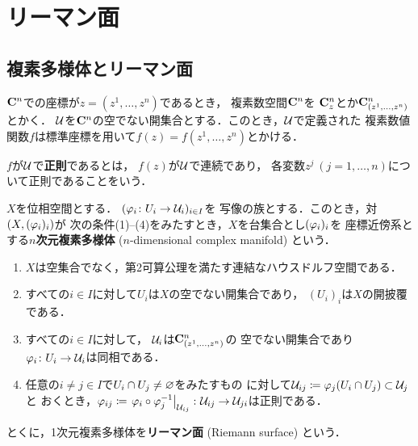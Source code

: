 
\section{リーマン面}

\subsection{複素多様体とリーマン面}

$\mathbf{C}^{n}$での座標が$z=(z^{1},\dots,z^{n})$であるとき，
複素数空間$\mathbf{C}^{n}$を
$\mathbf{C}^{n}_{z}$とか$\mathbf{C}^{n}_{(z^{1},\dots,z^{n})}$とかく．
$\mathcal{U}$を$\mathbf{C}^n$の空でない開集合とする．このとき，$\mathcal{U}$で定義された
複素数値関数$f$は標準座標を用いて$f(z)=f(z^{1},\dots,z^{n})$とかける．

$f$が$\mathcal{U}$で\textbf{正則}であるとは，
$f(z)$が$\mathcal{U}$で連続であり，
各変数$z^{j}\ (j=1,\dots,n)$について正則であることをいう．

\begin{Definition}\label{def:mnf}
    $X$を位相空間とする．
    $(\varphi_{i}\colon U_{i}\to \mathcal{U}_{i})_{i\in I}$を
    写像の族とする．このとき，対$(X,(\varphi_{i})_{i})$が
    次の条件(1)--(4)をみたすとき，$X$を台集合とし$(\varphi_{i})_i$を
    座標近傍系とする\textbf{$n$次元複素多様体} ($n$-dimensional complex manifold) という．
    \begin{enumerate}
        \renewcommand{\theenumi}{\arabic{enumi}}
        \renewcommand{\labelenumi}{(\theenumi)}
        \item $X$は空集合でなく，第2可算公理を満たす連結なハウスドルフ空間である．
        \item すべての$i\in I$に対して$U_i$は$X$の空でない開集合であり，
        $(U_i)_i$は$X$の開披覆である．
        \item すべての$i\in I$に対して，
        $\mathcal{U}_i$は$\mathbf{C}^{n}_{(z^{1},\dots,z^{n})}$の
        空でない開集合であり$\varphi_{i}\colon U_i\to\mathcal{U}_i$は同相である．
        \item 任意の$i\neq j \in I$で$U_i\cap U_j \neq \varnothing$をみたすもの
        に対して$\mathcal{U}_{ij}\coloneqq \varphi_j(U_i\cap U_j)\subset \mathcal{U}_j$と
        おくとき，$\varphi_{ij}\coloneqq 
        \left. \varphi_{i}\circ\varphi_{j}^{-1} \right|_{\mathcal{U}_{ij}}
        \colon 
        \mathcal{U}_{ij}\to\mathcal{U}_{ji}$は正則である．
    \end{enumerate}
    とくに，1次元複素多様体を\textbf{リーマン面} (Riemann surface) という．
\end{Definition}

